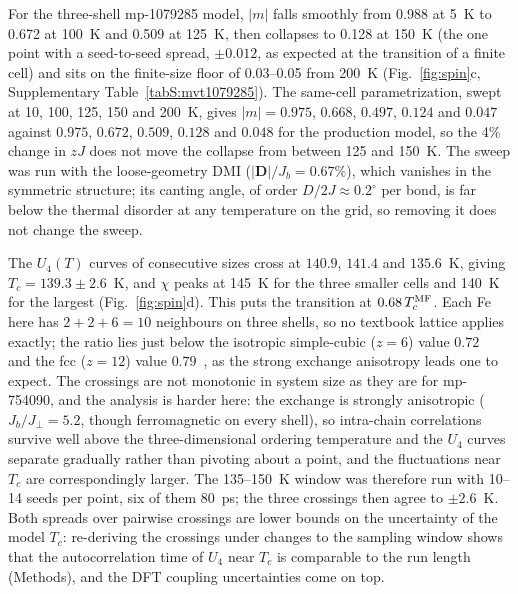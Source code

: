\documentclass[aps,prb,preprint,superscriptaddress,longbibliography,nofootinbib]{revtex4-2}
\begin{document}
For the three-shell mp-1079285 model, $|m|$ falls smoothly from 0.988 at 5~K to 0.672 at 100~K and 0.509 at
125~K, then collapses to 0.128 at 150~K (the one point with a seed-to-seed spread, $\pm0.012$, as expected at
the transition of a finite cell) and sits on the finite-size floor of 0.03--0.05 from 200~K
(Fig.~\ref{fig:spin}c, Supplementary Table~\ref{tabS:mvt1079285}). The same-cell parametrization, swept at 10,
100, 125, 150 and 200~K, gives $|m|=0.975$, $0.668$, $0.497$, $0.124$ and $0.047$ against $0.975$, $0.672$,
$0.509$, $0.128$ and $0.048$ for the production model, so the 4\% change in $zJ$ does not move the collapse
from between 125 and 150~K. The sweep was run with the loose-geometry DMI ($|\mathbf{D}|/J_b=0.67\%$), which vanishes in the symmetric
structure; its canting angle, of order $D/2J\approx0.2^\circ$ per bond, is far below the thermal disorder at
any temperature on the grid, so removing it does not change the sweep.

The $U_4(T)$ curves of consecutive sizes cross at $140.9$, $141.4$ and $135.6$~K, giving
$T_c = 139.3\pm2.6$~K, and $\chi$ peaks at 145~K for the three smaller cells and 140~K for the largest
(Fig.~\ref{fig:spin}d). This puts the transition at $0.68\,T_c^{\rm MF}$. Each Fe here has $2+2+6=10$ neighbours on three shells,
so no textbook lattice applies exactly; the ratio lies just below the isotropic simple-cubic ($z=6$) value
$0.72$~\cite{chen1993} and the fcc ($z=12$) value $0.79$~\cite{ritchie1972}, as the strong exchange anisotropy leads
one to expect. The
crossings are not monotonic in system size as they are for mp-754090, and the analysis is harder here: the
exchange is strongly anisotropic ($J_b/J_\perp = 5.2$, though ferromagnetic on every shell), so intra-chain
correlations survive well above the three-dimensional ordering temperature and the $U_4$ curves separate
gradually rather than pivoting about a point, and the fluctuations near $T_c$ are correspondingly larger. The
135--150~K window was therefore run with 10--14 seeds per point, six of them 80~ps; the
three crossings then agree to $\pm2.6$~K. Both spreads over pairwise crossings are lower bounds on the uncertainty
of the model $T_c$: re-deriving the crossings under changes to the sampling window shows that the
autocorrelation time of $U_4$ near $T_c$ is comparable to the run length (Methods), and the DFT coupling
uncertainties come on top.
\end{document}
